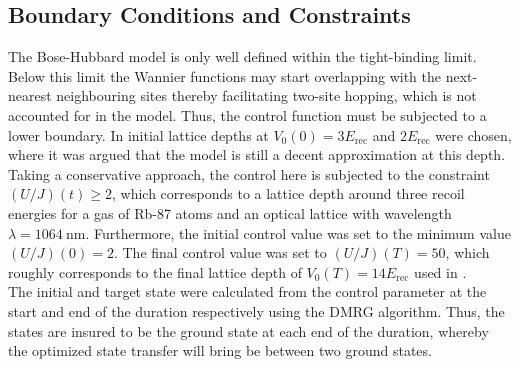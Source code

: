 \subsection{Boundary Conditions and Constraints}
The Bose-Hubbard model is only well defined within the tight-binding limit. Below this limit the Wannier functions may start overlapping with the next-nearest neighbouring sites thereby facilitating two-site hopping, which is not accounted for in the model. Thus, the control function must be subjected to a lower boundary. In \cite{FrankBloch,Doria2011} initial lattice depths at $V_0 (0) = 3 E_{\mathrm{rec}}$ and $2 E_{\mathrm{rec}}$ were chosen, where it was argued that the model is still a decent approximation at this depth.
Taking a conservative approach, the control here is subjected to the constraint $\left( U/J \right) (t) \geq 2$, which corresponds to a lattice depth around three recoil energies for a gas of Rb-87 atoms and an optical lattice with wavelength $\lambda = 1064 \: \mathrm{nm}$. 
Furthermore, the initial control value was set to the minimum value $(U/J) (0) = 2$. 
The final control value was set to $(U/J) (T) = 50$, which roughly corresponds to the final lattice depth of $V_0 (T) = 14 E_{\mathrm{rec}}$ used in \cite{FrankBloch}.\\
The initial and target state were calculated from the control parameter at the start and end of the duration respectively using the DMRG algorithm. Thus, the states are insured to be the ground state at each end of the duration, whereby the optimized state transfer will bring be between two ground states.


